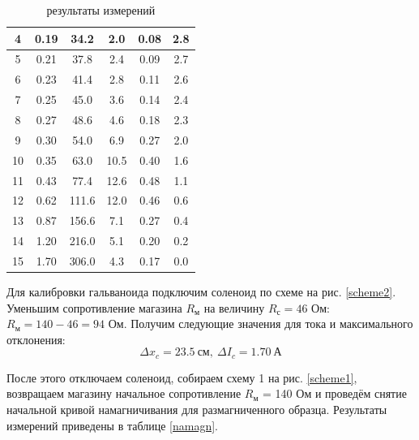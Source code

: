 \documentclass[a4paper,14pt]{article}
\begin{document}
\begin{table}[hbt!]
\begin{center}
\begin{tabular}{|c|c|c|c|c|c|}
4                & 0.19   & 34.2    & 2.0         & 0.08        & 2.8   \\ \hline
5                & 0.21   & 37.8    & 2.4         & 0.09        & 2.7   \\ \hline
6                & 0.23   & 41.4    & 2.8         & 0.11        & 2.6   \\ \hline
7                & 0.25   & 45.0    & 3.6         & 0.14        & 2.4   \\ \hline
8                & 0.27   & 48.6    & 4.6         & 0.18        & 2.3   \\ \hline
9                & 0.30   & 54.0    & 6.9         & 0.27        & 2.0   \\ \hline
10               & 0.35   & 63.0    & 10.5        & 0.40        & 1.6   \\ \hline
11               & 0.43   & 77.4    & 12.6        & 0.48        & 1.1   \\ \hline
12               & 0.62   & 111.6   & 12.0        & 0.46        & 0.6   \\ \hline
13               & 0.87   & 156.6   & 7.1         & 0.27        & 0.4   \\ \hline
14               & 1.20   & 216.0   & 5.1         & 0.20        & 0.2   \\ \hline
15               & 1.70   & 306.0   & 4.3         & 0.17        & 0.0   \\ \hline
	\end{tabular}
\caption{результаты измерений}
\label{tabb2}
\end{center}
\end{table}
\clearpage

Для калибровки гальваноида подключим соленоид по схеме на рис. \ref{scheme2}. Уменьшим сопротивление магазина $R_\text{м}$ на величину $R_\text{с} = 46$ Ом: $R_\text{м} = 140 - 46 = 94$ Ом. Получим следующие значения для тока и максимального отклонения:
\[
\Delta x_c = 23.5 \ \text{см}, \ \Delta I_c = 1.70 \ \text{А}
\]

После этого отключаем соленоид, собираем схему 1 на рис. \ref{scheme1}, возвращаем магазину начальное сопротивление $R_\text{м}$ = 140 Ом и проведём снятие начальной кривой намагничивания для размагниченного образца. Результаты измерений приведены в таблице \ref{namagn}.
\end{document}
